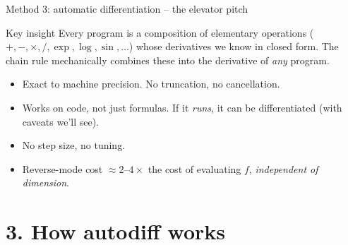 \documentclass[aspectratio=169,11pt]{beamer}
\newcommand{\emphc}[1]{\textcolor{harvardcrimson}{#1}}
\begin{document}
\begin{frame}[shrink=12]{Method 3: automatic differentiation -- the elevator pitch}
\small
\begin{block}{Key insight}
Every program is a composition of \emphc{elementary operations} ($+,-,\times,/,\exp,\log,\sin,\ldots$) whose derivatives we know in closed form. The chain rule mechanically combines these into the derivative of \emph{any} program.
\end{block}
\vspace{4pt}
\begin{center}
\end{center}
\vspace{2pt}
\begin{itemize}\itemsep3pt
\item \emphc{Exact to machine precision.} No truncation, no cancellation.
\item \emphc{Works on code}, not just formulas. If it \emph{runs}, it can be differentiated (with caveats we'll see).
\item \emphc{No step size}, no tuning.
\item \emphc{Reverse-mode cost} $\approx 2$--$4\times$ the cost of evaluating $f$, \emph{independent of dimension}.
\end{itemize}
\end{frame}


\section*{3. How autodiff works}
\end{document}

